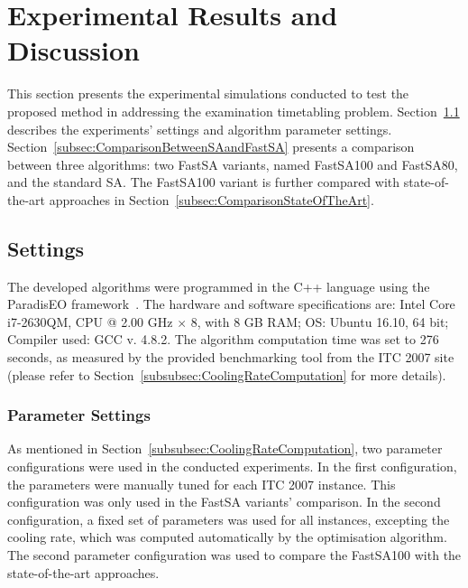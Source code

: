 %
%
\section{Experimental Results and Discussion}
\label{sec:ExperimentalResults}

This section presents the experimental simulations conducted to test the proposed method in addressing the examination timetabling problem. Section~\ref{subsec:Settings} describes the experiments' settings and algorithm parameter settings. Section~\ref{subsec:ComparisonBetweenSAandFastSA} presents a comparison between three algorithms: two FastSA variants, named FastSA100 and FastSA80, and the standard SA. The FastSA100 variant is further compared with state-of-the-art approaches in Section~\ref{subsec:ComparisonStateOfTheArt}.



\subsection{Settings}
\label{subsec:Settings}

\noindent The developed algorithms were programmed in the C++ language using the ParadisEO framework~\citep{Talbi2009}. The hardware and software specifications are: Intel Core i7-2630QM, CPU @ 2.00 GHz $\times$ 8, with 8 GB RAM; OS: Ubuntu 16.10, 64 bit; Compiler used: GCC v. 4.8.2. The algorithm computation time was set to 276 seconds, as measured by the provided benchmarking tool from the ITC 2007 site~\citep{ITC2007} (please refer to Section~\ref{subsubsec:CoolingRateComputation} for more details). 


\subsubsection{Parameter Settings}
\label{subsubsect:ParameterSettings}

As mentioned in Section~\ref{subsubsec:CoolingRateComputation}, two parameter configurations were used in the conducted experiments. In the first configuration, the parameters were manually tuned for each ITC 2007 instance. This configuration was only used in the FastSA variants' comparison. In the second configuration, a fixed set of parameters was used for all instances, excepting the cooling rate, which was computed automatically by the optimisation algorithm. The second parameter configuration was used to compare the FastSA100 with the state-of-the-art approaches.


